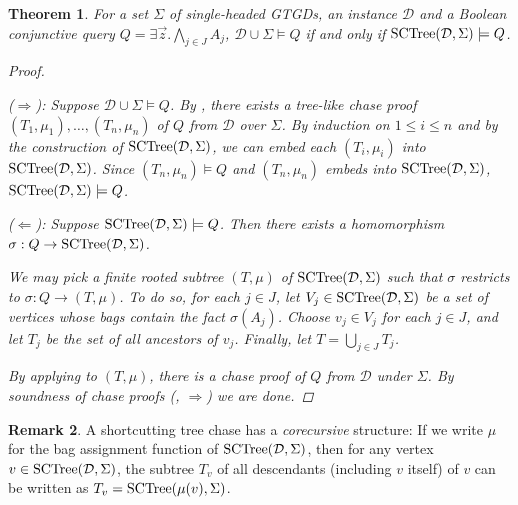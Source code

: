 \documentclass[12pt]{report}
\theoremstyle{plain}
\newtheorem{theorem}{Theorem}[chapter]
\theoremstyle{definition}
\newtheorem{remark}[theorem]{Remark}
\newcommand{\SCTree}[2]{\ensuremath{\normalfont{\textrm{SCTree}}\!\left( #1, #2 \right)}}
\begin{document}
\begin{theorem}
\label{theorem:sctree-soundness-completeness}
  For a set $\Sigma$ of single-headed GTGDs, an instance $\mathcal{D}$ and a Boolean conjunctive query $Q = \exists \vec{z}. \bigwedge_{j \in J} A_j$, $\mathcal{D} \cup \Sigma \models Q$ if and only if $\SCTree{\mathcal{D}}{\Sigma} \models Q$.
  \begin{proof}[Proof] $ $\par
    ($\Longrightarrow$): Suppose $\mathcal{D} \cup \Sigma \models Q$. By , there exists a tree-like chase proof $(T_1, \mu_1), \ldots, (T_n, \mu_n)$ of $Q$ from $\mathcal{D}$ over $\Sigma$. By induction on $1 \leq i \leq n$ and by the construction of $\SCTree{\mathcal{D}}{\Sigma}$, we can embed each $(T_i, \mu_i)$ into $\SCTree{\mathcal{D}}{\Sigma}$. Since $(T_n, \mu_n) \models Q$ and $(T_n, \mu_n)$ embeds into $\SCTree{\mathcal{D}}{\Sigma}$, $\SCTree{\mathcal{D}}{\Sigma} \models Q$.

    ($\Longleftarrow$): Suppose $\SCTree{\mathcal{D}}{\Sigma} \models Q$. Then there exists a homomorphism $\sigma:\nobreak Q \rightarrow \SCTree{\mathcal{D}}{\Sigma}$.
    
    We may pick a finite rooted subtree $(T, \mu)$ of $\SCTree{\mathcal{D}}{\Sigma}$ such that $\sigma$ restricts to $\sigma: Q \rightarrow (T, \mu)$. To do so, for each $j \in J$, let $V_j \in \SCTree{\mathcal{D}}{\Sigma}$ be a set of vertices whose bags contain the fact $\sigma(A_j)$. Choose $v_j \in V_j$ for each $j \in J$, and let $T_j$ be the set of all ancestors of $v_j$. Finally, let $T = \bigcup_{j \in J} T_j$.

    By applying  to $(T, \mu)$, there is a chase proof of $Q$ from $\mathcal{D}$ under $\Sigma$. By soundness of chase proofs (, $\Longrightarrow$) we are done.
  \end{proof}
\end{theorem}

\begin{remark}
\label{remark:corecursiveness-of-sctree}
  A shortcutting tree chase has a \emph{corecursive} structure: If we write $\mu$ for the bag assignment function of $\SCTree{\mathcal{D}}{\Sigma}$, then for any vertex $v \in \SCTree{\mathcal{D}}{\Sigma}$, the subtree $T_v$ of all descendants (including $v$ itself) of $v$ can be written as $T_v = \SCTree{\mu(v)}{\Sigma}$.
\end{remark}
\end{document}
